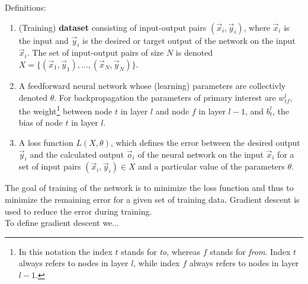 Definitions:
\begin{enumerate}
    \item (Training) \textbf{dataset} consisting of input-output pairs $(\vec{x}_i,
    \vec{y}_i)$, where $\vec{x}_i$ is the input and $\vec{y}_i$ is the desired or target
    output of the network on the input $\vec{x}_i$. The set of input-output pairs of size
    $N$ is denoted $X = \{(\vec{x}_1,\vec{y}_1), \dots, (\vec{x}_N,\vec{y}_N)\}$.
    \item A feedforward neural network whose (learning) parameters are collectivly denoted
    $\theta$. For backpropagation the parameters of primary interest are $w^l_{tf}$, the
    weight\footnote{In this notation the index $t$ stands for \emph{to}, whereas $f$
    stands for \emph{from}. Index $t$ always refers to nodes in layer $l$, while index $f$
    always refers to nodes in layer $l-1$.} between node $t$ in layer $l$ and node $f$ in
    layer $l-1$, and $b^l_t$, the bias of node $t$ in layer $l$.
    \item A loss function $L(X,\theta)$, which defines the error between the desired
    output $\vec{y}_i$ and the calculated output $\vec{o}_i$ of the neural network on the
    input $\vec{x}_i$ for a set of input pairs $(\vec{x}_i, \vec{y}_i) \in X$ and a
    particular value of the parameters $\theta$.
\end{enumerate}
The goal of training of the network is to minimize the loss function and thus to minimize
the remaining error for a given set of training data. Gradient descent is used to reduce
the error during training.\\

To define gradient descent we...


